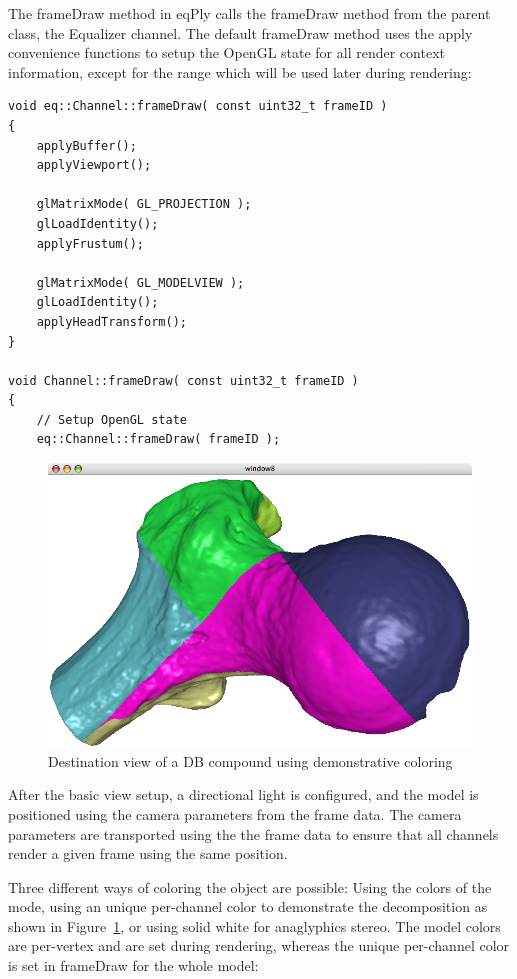 \documentclass[10pt,a4]{scrartcl}
\newcommand{\fig}[1]{Figure~\ref{#1}}
\begin{document}
The \textsf{frameDraw} method in \textsf{eqPly} calls the
\textsf{frameDraw} method from the parent class, the Equalizer
channel. The default \textsf{frameDraw} method uses the apply
convenience functions to setup the OpenGL state for all render context
information, except for the range which will be used later during
rendering:

{\footnotesize\begin{lstlisting}
void eq::Channel::frameDraw( const uint32_t frameID )
{
    applyBuffer();
    applyViewport();
    
    glMatrixMode( GL_PROJECTION );
    glLoadIdentity();
    applyFrustum();

    glMatrixMode( GL_MODELVIEW );
    glLoadIdentity();
    applyHeadTransform();
}

void Channel::frameDraw( const uint32_t frameID )
{
    // Setup OpenGL state
    eq::Channel::frameDraw( frameID );
\end{lstlisting}}

\begin{figure}
  \includegraphics[width=.382\textwidth]{images/DB.png}
  {\caption{\label{fDBDest}Destination view of a DB compound using
      demonstrative coloring}}
\end{figure}
After the basic view setup, a directional light is configured, and the
model is positioned using the camera parameters from the frame data. The
camera parameters are transported using the the frame data to ensure
that all channels render a given frame using the same position.

Three different ways of coloring the object are possible: Using the
colors of the mode, using an unique per-channel color to demonstrate the
decomposition as shown in \fig{fDBDest}, or using solid white for
anaglyphics stereo. The model colors are per-vertex and are set during
rendering, whereas the unique per-channel color is set in
\textsf{frameDraw} for the whole model:
\end{document}
